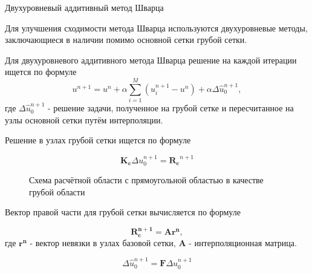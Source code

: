 \documentclass{beamer}
\begin{document}
\begin{frame}{Двухуровневый аддитивный метод Шварца}
\footnotesize
\begin{multicols}{2}
Для улучшения сходимости метода Шварца используются двухуровневые методы, заключающиеся в наличии помимо основной сетки грубой сетки.

Для двухуровневого аддитивного метода Шварца решение на каждой итерации ищется по формуле
\begin{equation*}
u^{n+1} = u^n + \alpha\sum_{i=1}^{M} {(u_i^{n+1} - u^n)} + \alpha \Delta \hat{u}_0^{n+1},
\end{equation*}
где $\Delta \hat{u}_0^{n+1}$ - решение задачи, полученное на грубой сетке и пересчитанное на узлы основной сетки путём интерполяции.

Решение в узлах грубой сетки ищется по формуле

\begin{equation*}
\mathbf{K_c} \Delta u_0^{n+1} = \mathbf{R_c}^{n+1}
\end{equation*}

\columnbreak

\begin{figure}[h]
\caption{Схема расчётной области с прямоугольной областью в качестве грубой области}
\end{figure}

Вектор правой части для грубой сетки вычисляется по формуле

\begin{equation*}
\mathbf{R_c^{n+1}} = \mathbf{A} \mathbf{r^n},
\end{equation*}
где $\mathbf{r^n}$ - вектор невязки в узлах базовой сетки, $\mathbf{A}$ - интерполяционная матрица.

\begin{equation*}
\Delta \hat{u}_0^{n+1} = \mathbf{F} \Delta u_0^{n+1}
\end{equation*}

\end{multicols}
\end{frame}
\end{document}

